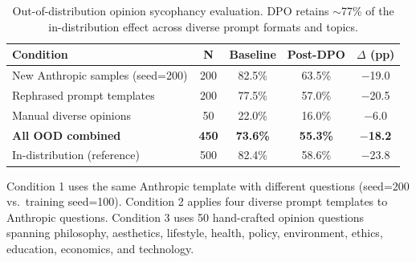 \documentclass{article}
\begin{document}
\begin{table}[h]
\centering
\caption{Out-of-distribution opinion sycophancy evaluation. DPO retains ${\sim}$77\% of the in-distribution effect across diverse prompt formats and topics.}
\label{tab:ood}
\small
\begin{tabular}{@{}lcccc@{}}
\toprule
\textbf{Condition} & \textbf{N} & \textbf{Baseline} & \textbf{Post-DPO} & \textbf{$\Delta$ (pp)} \\
\midrule
New Anthropic samples (seed=200) & 200 & 82.5\% & 63.5\% & $-$19.0 \\
Rephrased prompt templates & 200 & 77.5\% & 57.0\% & $-$20.5 \\
Manual diverse opinions & 50 & 22.0\% & 16.0\% & $-$6.0 \\
\midrule
\textbf{All OOD combined} & \textbf{450} & \textbf{73.6\%} & \textbf{55.3\%} & $\boldsymbol{-}$\textbf{18.2} \\
\midrule
In-distribution (reference) & 500 & 82.4\% & 58.6\% & $-$23.8 \\
\bottomrule
\end{tabular}
\end{table}

\noindent Condition 1 uses the same Anthropic template with different questions (seed=200 vs.\ training seed=100). Condition 2 applies four diverse prompt templates to Anthropic questions. Condition 3 uses 50 hand-crafted opinion questions spanning philosophy, aesthetics, lifestyle, health, policy, environment, ethics, education, economics, and technology.
\end{document}
